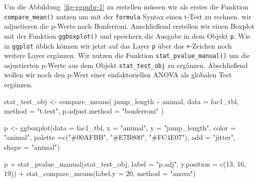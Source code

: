 \documentclass[
  letterpaper,
]{scrbook}
\newenvironment{Shaded}{\begin{snugshade}}{\end{snugshade}}
\newcommand{\AttributeTok}[1]{\textcolor[rgb]{0.40,0.45,0.13}{#1}}
\newcommand{\DecValTok}[1]{\textcolor[rgb]{0.68,0.00,0.00}{#1}}
\newcommand{\FunctionTok}[1]{\textcolor[rgb]{0.28,0.35,0.67}{#1}}
\newcommand{\NormalTok}[1]{\textcolor[rgb]{0.00,0.23,0.31}{#1}}
\newcommand{\OtherTok}[1]{\textcolor[rgb]{0.00,0.23,0.31}{#1}}
\newcommand{\SpecialCharTok}[1]{\textcolor[rgb]{0.37,0.37,0.37}{#1}}
\newcommand{\StringTok}[1]{\textcolor[rgb]{0.13,0.47,0.30}{#1}}
\begin{document}
Um die Abbildung~\ref{fig-ggpubr-1} zu erstellen müssen wir als erstes
die Funktion \texttt{compare\_mean()} nutzen um mit der \texttt{formula}
Syntax einen t-Test zu rechnen. wir adjustieren die p-Werte nach
Bonferroni. Anschließend erstellen wir einen Boxplot mit der Funktion
\texttt{ggboxplot()} und speichern die Ausgabe in dem Objekt \texttt{p}.
Wie in \texttt{ggplot} üblich können wir jetzt auf das Layer \texttt{p}
über das \texttt{+}-Zeichen noch weitere Layer ergänzen. Wir nutzen die
Funktion \texttt{stat\_pvalue\_manual()} um die asjustierten p-Werte aus
dem Objekt \texttt{stat\_test\_obj} zu ergänzen. Abschließend wollen wir
noch den p-Wert einer einfaktoriellen ANOVA als globalen Test ergänzen.

\begin{Shaded}
\begin{Highlighting}[]
\NormalTok{stat\_test\_obj }\OtherTok{\textless{}{-}} \FunctionTok{compare\_means}\NormalTok{(}
\NormalTok{ jump\_length }\SpecialCharTok{\textasciitilde{}}\NormalTok{ animal, }\AttributeTok{data =}\NormalTok{ fac1\_tbl,}
 \AttributeTok{method =} \StringTok{"t.test"}\NormalTok{,}
 \AttributeTok{p.adjust.method =} \StringTok{"bonferroni"}
\NormalTok{)}

\NormalTok{p }\OtherTok{\textless{}{-}} \FunctionTok{ggboxplot}\NormalTok{(}\AttributeTok{data =}\NormalTok{ fac1\_tbl, }\AttributeTok{x =} \StringTok{"animal"}\NormalTok{, }\AttributeTok{y =} \StringTok{"jump\_length"}\NormalTok{,}
               \AttributeTok{color =} \StringTok{"animal"}\NormalTok{, }\AttributeTok{palette =}\FunctionTok{c}\NormalTok{(}\StringTok{"\#00AFBB"}\NormalTok{, }\StringTok{"\#E7B800"}\NormalTok{, }\StringTok{"\#FC4E07"}\NormalTok{),}
               \AttributeTok{add =} \StringTok{"jitter"}\NormalTok{, }\AttributeTok{shape =} \StringTok{"animal"}\NormalTok{)}

\NormalTok{p }\SpecialCharTok{+} \FunctionTok{stat\_pvalue\_manual}\NormalTok{(stat\_test\_obj, }\AttributeTok{label =} \StringTok{"p.adj"}\NormalTok{, }\AttributeTok{y.position =} \FunctionTok{c}\NormalTok{(}\DecValTok{13}\NormalTok{, }\DecValTok{16}\NormalTok{, }\DecValTok{19}\NormalTok{)) }\SpecialCharTok{+}
  \FunctionTok{stat\_compare\_means}\NormalTok{(}\AttributeTok{label.y =} \DecValTok{20}\NormalTok{, }\AttributeTok{method =} \StringTok{"anova"}\NormalTok{)    }
\end{Highlighting}
\end{Shaded}
\end{document}
